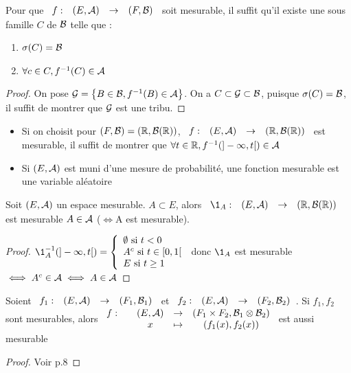 \documentclass[]{report}
\begin{document}
\begin{prop}{}{}
    Pour que $\begin{array}{ccccc} f : & (E,\mathcal{A}) & \to & (F,\mathcal{B}) \end{array}$ soit mesurable, il suffit qu'il existe une sous famille $C$ de $\mathcal{B}$ telle que :
    \begin{enumerate}
        \item $\sigma(C)=\mathcal{B}$
        \item $\forall c\in C,f^{-1}(C)\in\mathcal{A}$
    \end{enumerate}
\end{prop}

\begin{proof}{}{}
    On pose $\mathcal{G}=\left\{ B\in\mathcal{B},f^{-1}(B)\in\mathcal{A} \right\}$. On a $C\subset\mathcal{G}\subset\mathcal{B}$, puisque $\sigma(C)=\mathcal{B}$, il suffit de montrer que $\mathcal{G}$ est une tribu.
\end{proof}

\begin{ex}{}{}
    \begin{itemize}
        \item Si on choisit pour $(F,\mathcal{B})=(\mathbb{R},\mathcal{B}(\mathbb{R}))$, $\begin{array}{ccccc} f : & (E,\mathcal{A}) & \to & (\mathbb{R},\mathcal{B}(\mathbb{R})) \end{array}$ est mesurable, il suffit de montrer que $\forall t\in\mathbb{R},f^{-1}(]-\infty,t[)\in\mathcal{A}$
        \item Si $(E,\mathcal{A})$ est muni d'une mesure de probabilité, une fonction mesurable est une variable aléatoire
    \end{itemize}
\end{ex}

\begin{prop}{}{}
    Soit $(E,\mathcal{A})$ un espace mesurable. $A\subset E$, alors $\funto{\1_A}{(E,\Ar)}{\RBR}$ est mesurable \ssi $A\in\mathcal{A}$ ($\iff$A est mesurable).
\end{prop}

\begin{proof}{}{}
    $\1_A^{-1}(]-\infty,t[)=\cho{\emptyset\text{ si }t<0\\
    A^c\text{ si }t\in[0,1[\\
    E\text{ si }t\ge 1}$ donc $\1_A$ est mesurable$\iff A^c\in\mathcal{A}\iff A\in \mathcal{A}$
\end{proof}

\begin{prop}{}{}
    Soient $\begin{array}{ccccc} f_1 : & (E,\mathcal{A}) & \to & (F_1,\mathcal{B}_1) \end{array}$ et $\begin{array}{ccccc} f_2 : & (E,\mathcal{A}) & \to & (F_2,\mathcal{B}_2) \end{array}$.
    Si $f_1,f_2$ sont mesurables, alors $\begin{array}{ccccc} f : & & (E,\mathcal{A}) & \to & (F_1\times F_2,\mathcal{B}_1\otimes\mathcal{B}_2) \\ & & x & \mapsto & (f_1(x),f_2(x)) \end{array}$ est aussi mesurable
\end{prop}

\begin{proof}{}{}
    Voir p.8
\end{proof}
\end{document}

